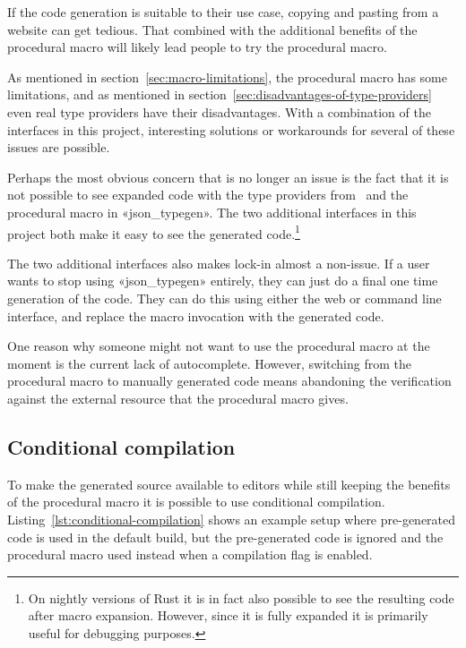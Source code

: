 If the code generation is suitable to their use case, copying and pasting from a website can get tedious. That combined with the additional benefits of the procedural macro will likely lead people to try the procedural macro.

As mentioned in section~\ref{sec:macro-limitations}, the procedural macro has some limitations, and as mentioned in section~\ref{sec:disadvantages-of-type-providers} even real type providers have their disadvantages. With a combination of the interfaces in this project, interesting solutions or workarounds for several of these issues are possible.

Perhaps the most obvious concern that is no longer an issue is the fact that it is not possible to see expanded code with the type providers from \fsharpdata\ and the procedural macro in «json_typegen».
The two additional interfaces in this project both make it easy to see the generated code.\footnote{On nightly versions of Rust it is in fact also possible to see the resulting code after macro expansion. However, since it is fully expanded it is primarily useful for debugging purposes.}

The two additional interfaces also makes lock-in almost a non-issue. If a user wants to stop using «json_typegen» entirely, they can just do a final one time generation of the code. They can do this using either the web or command line interface, and replace the macro invocation with the generated code.

One reason why someone might not want to use the procedural macro at the moment is the current lack of autocomplete. However, switching from the procedural macro to manually generated code means abandoning the verification against the external resource that the procedural macro gives.

\subsection{Conditional compilation}


To make the generated source available to editors while still keeping the benefits of the procedural macro it is possible to use conditional compilation. Listing~\ref{lst:conditional-compilation} shows an example setup where pre-generated code is used in the default build, but the pre-generated code is ignored and the procedural macro used instead when a compilation flag is enabled.

